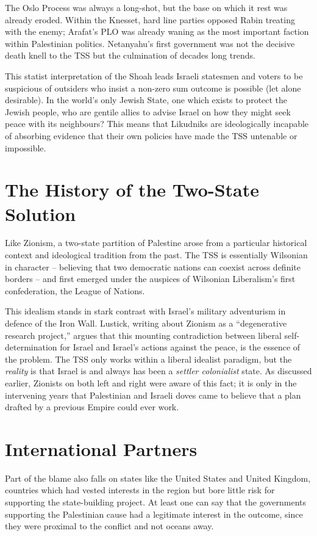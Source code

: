 \documentclass[letterpaper,12pt,twoside]{article} %
\begin{document}
\begin{multicols}{2}
The Oslo Process was always a long-shot, but the base on which it rest was already eroded. Within the Knesset, hard line parties opposed Rabin treating with the enemy; Arafat's PLO was already waning as the most important faction within Palestinian politics. Netanyahu's first government was not the decisive death knell to the TSS but the culmination of decades long trends.

This statist interpretation of the Shoah leads Israeli statesmen and voters to be suspicious of outsiders who insist a non-zero sum outcome is possible (let alone desirable). In the world's only Jewish State, one which exists to protect the Jewish people, who are gentile allies to advise Israel on how they might seek peace with its neighbours? This means that Likudniks are ideologically incapable of absorbing evidence that their own policies have made the TSS untenable or impossible.

\section{The History of the Two-State Solution}

Like Zionism, a two-state partition of Palestine arose from a particular historical context and ideological tradition from the past. The TSS is essentially Wilsonian in character -- believing that two democratic nations can coexist across definite borders -- and first emerged under the auspices of Wilsonian Liberalism's first confederation, the League of Nations. 

This idealism stands in stark contrast with Israel's military adventurism in defence of the Iron Wall. Lustick, writing about Zionism as a ``degenerative research project,'' argues that this mounting contradiction between liberal self-determination for Israel and Israel's actions against the peace, is the essence of the problem. The TSS only works within a liberal idealist paradigm, but the \textit{reality} is that Israel is and always has been a \textit{settler colonialist} state. As discussed earlier, Zionists on both left and right were aware of this fact; it is only in the intervening years that Palestinian and Israeli doves came to believe that a plan drafted by a previous Empire could ever work.

\section{International Partners}

Part of the blame also falls on states like the United States and United Kingdom, countries which had vested interests in the region but bore little risk for supporting the state-building project. At least one can say that the governments supporting the Palestinian cause had a legitimate interest in the outcome, since they were proximal to the conflict and not oceans away. 


\end{multicols}
\end{document}
